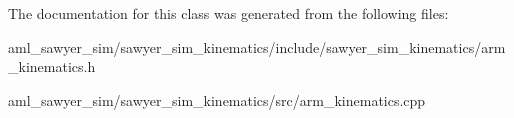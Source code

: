 The documentation for this class was generated from the following files\-:\begin{DoxyCompactItemize}
\item 
aml\-\_\-sawyer\-\_\-sim/sawyer\-\_\-sim\-\_\-kinematics/include/sawyer\-\_\-sim\-\_\-kinematics/arm\-\_\-kinematics.\-h\item 
aml\-\_\-sawyer\-\_\-sim/sawyer\-\_\-sim\-\_\-kinematics/src/arm\-\_\-kinematics.\-cpp\end{DoxyCompactItemize}
